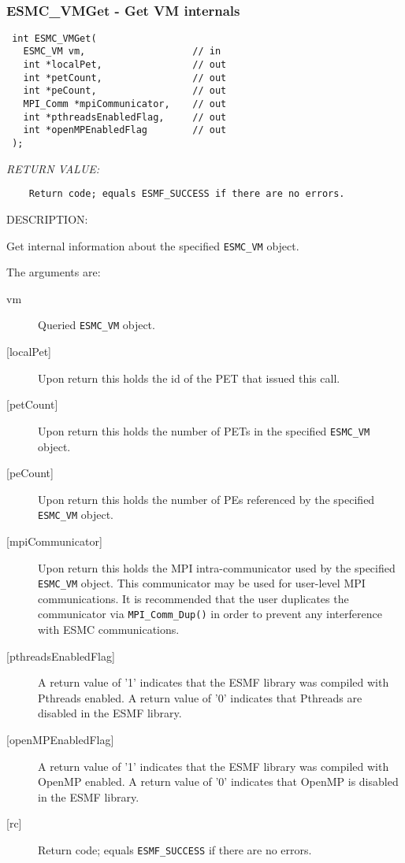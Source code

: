  
\mbox{}\hrulefill\ 
 
\subsubsection [ESMC\_VMGet] {ESMC\_VMGet - Get VM internals}


  
\begin{verbatim} int ESMC_VMGet(
   ESMC_VM vm,                   // in
   int *localPet,                // out
   int *petCount,                // out
   int *peCount,                 // out
   MPI_Comm *mpiCommunicator,    // out
   int *pthreadsEnabledFlag,     // out
   int *openMPEnabledFlag        // out
 );\end{verbatim}{\em RETURN VALUE:}
\begin{verbatim}    Return code; equals ESMF_SUCCESS if there are no errors.\end{verbatim}
{\sf DESCRIPTION:\\ }


  
    Get internal information about the specified {\tt ESMC\_VM} object.
  
    The arguments are:
    \begin{description}
    \item[vm] 
      Queried {\tt ESMC\_VM} object.
    \item[{[localPet]}] 
      Upon return this holds the id of the PET that issued this call.
    \item[{[petCount]}]
      Upon return this holds the number of PETs in the specified {\tt ESMC\_VM}
      object.
    \item[{[peCount]}]
      Upon return this holds the number of PEs referenced by the specified
      {\tt ESMC\_VM} object.
    \item[{[mpiCommunicator]}]
      Upon return this holds the MPI intra-communicator used by the 
      specified {\tt ESMC\_VM} object. This communicator may be used for
      user-level MPI communications. It is recommended that the user
      duplicates the communicator via {\tt MPI\_Comm\_Dup()} in order to
      prevent any interference with ESMC communications.
    \item[{[pthreadsEnabledFlag]}]
      A return value of '1' indicates that the ESMF library was compiled with
      Pthreads enabled. A return value of '0' indicates that Pthreads are
      disabled in the ESMF library.
    \item[{[openMPEnabledFlag]}]
      A return value of '1' indicates that the ESMF library was compiled with
      OpenMP enabled. A return value of '0' indicates that OpenMP is
      disabled in the ESMF library.
    \item[{[rc]}]
      Return code; equals {\tt ESMF\_SUCCESS} if there are no errors.
    \end{description}
   
